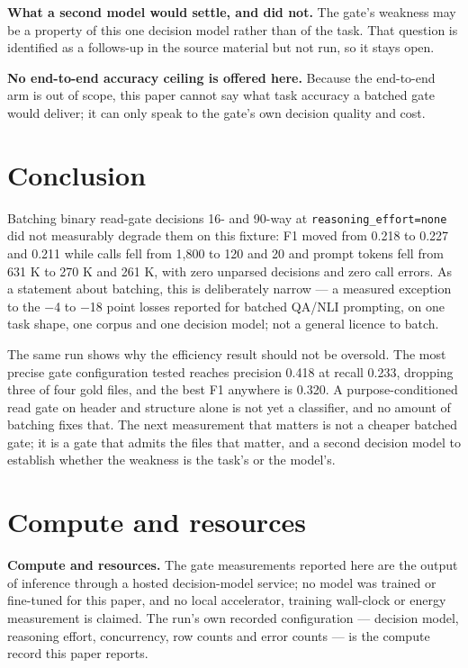 \documentclass[11pt,a4paper]{article}
\begin{document}
\textbf{What a second model would settle, and did not.} The gate's weakness may be a property of this one decision model rather than of the task. That question is identified as a follows-up in the source material but not run, so it stays open.

\textbf{No end-to-end accuracy ceiling is offered here.} Because the end-to-end arm is out of scope, this paper cannot say what task accuracy a batched gate would deliver; it can only speak to the gate's own decision quality and cost.

\section{Conclusion}

Batching binary read-gate decisions 16- and 90-way at \texttt{reasoning\_effort=none} did not measurably degrade them on this fixture: F1 moved from 0.218 to 0.227 and 0.211 while calls fell from 1,800 to 120 and 20 and prompt tokens fell from 631 K to 270 K and 261 K, with zero unparsed decisions and zero call errors. As a statement about batching, this is deliberately narrow --- a measured exception to the $-$4 to $-$18 point losses reported for batched QA/NLI prompting, on one task shape, one corpus and one decision model; not a general licence to batch.

The same run shows why the efficiency result should not be oversold. The most precise gate configuration tested reaches precision 0.418 at recall 0.233, dropping three of four gold files, and the best F1 anywhere is 0.320. A purpose-conditioned read gate on header and structure alone is not yet a classifier, and no amount of batching fixes that. The next measurement that matters is not a cheaper batched gate; it is a gate that admits the files that matter, and a second decision model to establish whether the weakness is the task's or the model's.

\section*{Compute and resources}

\textbf{Compute and resources.} The gate measurements reported here are the output of inference through a hosted decision-model service; no model was trained or fine-tuned for this paper, and no local accelerator, training wall-clock or energy measurement is claimed. The run's own recorded configuration --- decision model, reasoning effort, concurrency, row counts and error counts --- is the compute record this paper reports.
\end{document}
